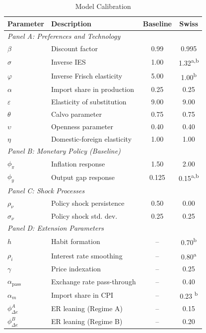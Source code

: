 \documentclass[12pt,a4paper]{article}
\begin{document}
\begin{table}[H]
	\centering
	\caption{Model Calibration}
	\label{tab:calibration}
	\small
	\begin{tabular}{@{}llcc@{}}
		\toprule
		\textbf{Parameter} & \textbf{Description} & \textbf{Baseline} & \textbf{Swiss} \\
		\midrule
		\multicolumn{4}{l}{\textit{Panel A: Preferences and Technology}} \\
		$\beta$ & Discount factor & 0.99 & 0.995 \\
		$\sigma$ & Inverse IES & 1.00 & 1.32\textsuperscript{a,b} \\
		$\varphi$ & Inverse Frisch elasticity & 5.00 & 1.00\textsuperscript{b} \\
		$\alpha$ & Import share in production & 0.25 & 0.25 \\
		$\varepsilon$ & Elasticity of substitution & 9.00 & 9.00 \\
		$\theta$ & Calvo parameter & 0.75 & 0.75 \\
		$\upsilon$ & Openness parameter & 0.40 & 0.40 \\
		$\eta$ & Domestic-foreign elasticity & 1.00 & 1.00 \\
		\midrule
		\multicolumn{4}{l}{\textit{Panel B: Monetary Policy (Baseline)}} \\
		$\phi_\pi$ & Inflation response & 1.50 & 2.00 \\
		$\phi_y$ & Output gap response & 0.125 & 0.15\textsuperscript{a,b} \\
		\midrule
		\multicolumn{4}{l}{\textit{Panel C: Shock Processes}} \\
		$\rho_\nu$ & Policy shock persistence & 0.50 & 0.00 \\
		$\sigma_\nu$ & Policy shock std. dev. & 0.25 & 0.25 \\
		\midrule
		\multicolumn{4}{l}{\textit{Panel D: Extension Parameters}} \\
		$h$ & Habit formation & -- & 0.70\textsuperscript{b} \\
		$\rho_i$ & Interest rate smoothing & -- & 0.80\textsuperscript{a} \\
		$\gamma$ & Price indexation & -- & 0.25 \\
		$\alpha_{\text{pass}}$ & Exchange rate pass-through & -- & 0.40 \\
		$\alpha_m$ & Import share in CPI & -- & 0.23 \textsuperscript{b} \\
		$\phi_{\Delta e}^A$ & ER leaning (Regime A) & -- & 0.15 \\
		$\phi_{\Delta e}^B$ & ER leaning (Regime B) & -- & 0.20 \\

\end{tabular}
\end{table}
\end{document}
